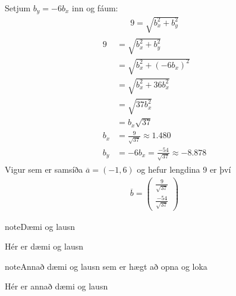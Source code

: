 \documentclass[letterpaper,10pt,english]{sphinxmanual}
\begin{document}
\sphinxAtStartPar
Setjum \(b_y=-6b_x\) inn og fáum:
\begin{equation*}
\begin{split}9 = \sqrt{b_x^2+b_y^2}\end{split}
\end{equation*}\begin{equation*}
\begin{split}\begin{aligned}
9 &= \sqrt{b_x^2+b_y^2}\\
&=\sqrt{b_x^2+(-6b_x)^2} \\
&= \sqrt{b_x^2+36b_x^2} \\
&=\sqrt{37b_x^2} \\
&=b_x\sqrt{37} \\
b_x&=\frac{9}{\sqrt{37}} \approx 1.480\\
b_y&= -6b_x = \frac{-54}{\sqrt{37}} \approx -8.878
\end{aligned}\end{split}
\end{equation*}
\sphinxAtStartPar
Vigur sem er samsíða \(\overline{a}=(-1,6)\) og hefur lengdina 9 er því
\begin{equation*}
\begin{split}\overline{b}= \begin{pmatrix} \frac{9}{\sqrt{37}} \\  \frac{-54}{\sqrt{37}} \end{pmatrix}\end{split}
\end{equation*}
\begin{sphinxadmonition}{note}{Dæmi og lausn}

\sphinxAtStartPar
Hér er dæmi og lausn
\end{sphinxadmonition}

\begin{sphinxadmonition}{note}{Annað dæmi og lausn sem er hægt að opna og loka}

\sphinxAtStartPar
Hér er annað dæmi og lausn
\end{sphinxadmonition}
\end{document}
